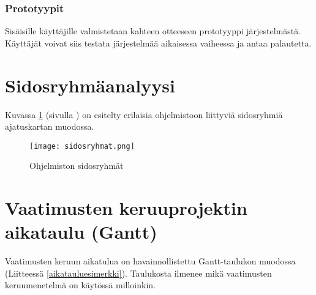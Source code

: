         \subsubsection*{Prototyypit}

        Sisäisille käyttäjille valmistetaan kahteen otteeseen prototyyppi järjestelmästä. Käyttäjät voivat siis testata järjestelmää aikaisessa vaiheessa ja antaa palautetta.
	
\section{Sidosryhmäanalyysi}

        Kuvassa \ref{img:sidosryhmat} (sivulla \pageref{img:sidosryhmat}) on esitelty erilaisia ohjelmistoon liittyviä sidosryhmiä ajatuskartan muodossa.

        \begin{figure}[H] %
		\centering
		\texttt{[image: sidosryhmat.png]}
		\caption{Ohjelmiston sidosryhmät} %
		\label{img:sidosryhmat}
	\end{figure}
	
\section{Vaatimusten keruuprojektin aikataulu (Gantt)}

	Vaatimusten keruun aikatulua on havainnollistettu Gantt-taulukon muodossa (Liitteessä \ref{aikatauluesimerkki}). Taulukosta ilmenee mikä vaatimusten keruumenetelmä on käytössä milloinkin.

